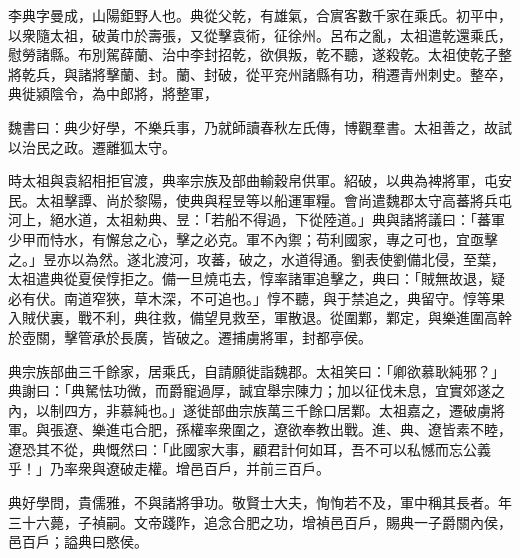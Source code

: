 
\begin{pinyinscope}
李典字曼成，山陽鉅野人也。典從父乾，有雄氣，合賔客數千家在乘氏。初平中，以衆隨太祖，破黃巾於壽張，又從擊袁術，征徐州。呂布之亂，太祖遣乾還乘氏，慰勞諸縣。布別駕薛蘭、治中李封招乾，欲俱叛，乾不聽，遂殺乾。太祖使乾子整將乾兵，與諸將擊蘭、封。蘭、封破，從平兖州諸縣有功，稍遷青州刺史。整卒，典徙潁陰令，為中郎將，將整軍，

魏書曰：典少好學，不樂兵事，乃就師讀春秋左氏傳，博觀羣書。太祖善之，故試以治民之政。遷離狐太守。

時太祖與袁紹相拒官渡，典率宗族及部曲輸穀帛供軍。紹破，以典為裨將軍，屯安民。太祖擊譚、尚於黎陽，使典與程昱等以船運軍糧。會尚遣魏郡太守高蕃將兵屯河上，絕水道，太祖勑典、昱：「若船不得過，下從陸道。」典與諸將議曰：「蕃軍少甲而恃水，有懈怠之心，擊之必克。軍不內禦；苟利國家，專之可也，宜亟擊之。」昱亦以為然。遂北渡河，攻蕃，破之，水道得通。劉表使劉備北侵，至葉，太祖遣典從夏侯惇拒之。備一旦燒屯去，惇率諸軍追擊之，典曰：「賊無故退，疑必有伏。南道窄狹，草木深，不可追也。」惇不聽，與于禁追之，典留守。惇等果入賊伏裏，戰不利，典往救，備望見救至，軍散退。從圍鄴，鄴定，與樂進圍高幹於壺關，擊管承於長廣，皆破之。遷捕虜將軍，封都亭侯。

典宗族部曲三千餘家，居乘氏，自請願徙詣魏郡。太祖笑曰：「卿欲慕耿純邪？」典謝曰：「典駑怯功微，而爵寵過厚，誠宜舉宗陳力；加以征伐未息，宜實郊遂之內，以制四方，非慕純也。」遂徙部曲宗族萬三千餘口居鄴。太祖嘉之，遷破虜將軍。與張遼、樂進屯合肥，孫權率衆圍之，遼欲奉教出戰。進、典、遼皆素不睦，遼恐其不從，典慨然曰：「此國家大事，顧君計何如耳，吾不可以私憾而忘公義乎！」乃率衆與遼破走權。增邑百戶，并前三百戶。

典好學問，貴儒雅，不與諸將爭功。敬賢士大夫，恂恂若不及，軍中稱其長者。年三十六薨，子禎嗣。文帝踐阼，追念合肥之功，增禎邑百戶，賜典一子爵關內侯，邑百戶；謚典曰愍侯。


\end{pinyinscope}